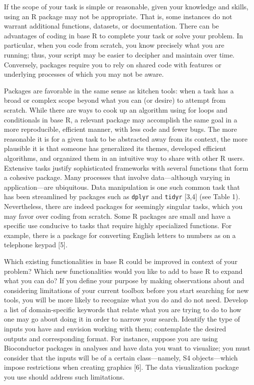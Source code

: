 \documentclass[10pt,letterpaper]{article}
\begin{document}
If the scope of your task is simple or reasonable, given your knowledge
and skills, using an R package may not be appropriate. That is, some
instances do not warrant additional functions, datasets, or
documentation. There can be advantages of coding in base R to complete
your task or solve your problem. In particular, when you code from
scratch, you know precisely what you are running; thus, your script may
be easier to decipher and maintain over time. Conversely, packages
require you to rely on shared code with features or underlying processes
of which you may not be aware.

Packages are favorable in the same sense as kitchen tools: when a task
has a broad or complex scope beyond what you can (or desire) to attempt
from scratch. While there are ways to cook up an algorithm using for
loops and conditionals in base R, a relevant package may accomplish the
same goal in a more reproducible, efficient manner, with less code and
fewer bugs. The more reasonable it is for a given task to be abstracted
away from its context, the more plausible it is that someone has
generalized its themes, developed efficient algorithms, and organized
them in an intuitive way to share with other R users. Extensive tasks
justify sophisticated frameworks with several functions that form a
cohesive package. Many processes that involve data---although varying in
application---are ubiquitous. Data manipulation is one such common task
that has been streamlined by packages such as \texttt{dplyr} and
\texttt{tidyr} {[}3,4{]} (see Table 1). Nevertheless, there are indeed
packages for seemingly singular tasks, which you may favor over coding
from scratch. Some R packages are small and have a specific use
conducive to tasks that require highly specialized functions. For
example, there is a package for converting English letters to numbers as
on a telephone keypad {[}5{]}.

Which existing functionalities in base R could be improved in context of
your problem? Which new functionalities would you like to add to base R
to expand what you can do? If you define your purpose by making
observations about and considering limitations of your current toolbox
before you start searching for new tools, you will be more likely to
recognize what you do and do not need. Develop a list of domain-specific
keywords that relate what you are trying to do to how one may go about
doing it in order to narrow your search. Identify the type of inputs you
have and envision working with them; contemplate the desired outputs and
corresponding format. For instance, suppose you are using Bioconductor
packages in analyses and have data you want to visualize; you must
consider that the inputs will be of a certain class---namely, S4
objects---which impose restrictions when creating graphics {[}6{]}. The
data visualization package you use should address such limitations.
\end{document}
